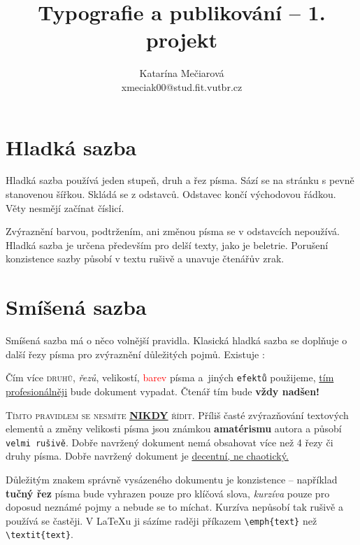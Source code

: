 \documentclass[10pt, twocolumn]{article}[25.2.2024]
\title{Typografie a publikování -- 1. projekt}
\author{Katarína Mečiarová\\xmeciak00@stud.fit.vutbr.cz}
\date{ }
\begin{document}
    \maketitle


    \section{Hladká sazba}
        Hladká sazba používá jeden stupeň, druh a řez písma.
        Sází se na stránku s pevně stanovenou šířkou.
        Skládá se z odstavců. Odstavec končí východovou řádkou.
        Věty nesmějí začínat číslicí.

        Zvýraznění barvou, podtržením, ani změnou písma se v odstavcích nepoužívá.
        Hladká sazba je určena především pro delší texty, jako je beletrie.
        Porušení konzistence sazby působí v textu rušivě a unavuje čtenářův zrak.

    \section{Smíšená sazba}
        Smíšená sazba má o něco volnější pravidla.
        Klasická hladká sazba se doplňuje o další řezy písma pro zvýraznění důležitých pojmů.
        Existuje :

        \medskip
        \begin{adjustwidth}{0.8cm}{0.8cm}
        \hspace{0.3cm}
        Čím více \textsc{druhů}, \textit{řezů}, {\scriptsize velikostí}, \textcolor{red}{barev} písma a~jiných \texttt{efektů} použijeme, \underline{tím profesionálněji}
        bude {\selectfont dokument} vypadat. Čtenář tím bude {\huge \bfseries vždy nadšen!}
        \end{adjustwidth}
        \medskip

        \textsc{Tímto pravidlem se nesmíte \underline{\textbf{\MakeUppercase{\scriptsize nikdy}}} řídit.}
        Příliš časté zvýrazňování textových elementů a změny {\tiny velikosti} písma jsou známkou \textbf{amatérismu} autora a působí \texttt{velmi rušivě}.
        Dobře navržený dokument nemá obsahovat více než 4 řezy či druhy písma.
        Dobře navržený dokument je \underline{decentní, ne chaotický.}

        Důležitým znakem správně vysázeného dokumentu je konzistence -- například \textbf{tučný řez} písma bude vyhrazen pouze pro klíčová slova, \textit{kurzíva} pouze pro doposud neznámé pojmy a nebude se to míchat.
        Kurzíva nepůsobí tak rušivě a používá se častěji.
        V \LaTeX u ji sázíme raději příkazem \verb|\emph{text}| než \verb|\textit{text}|.
\end{document}
